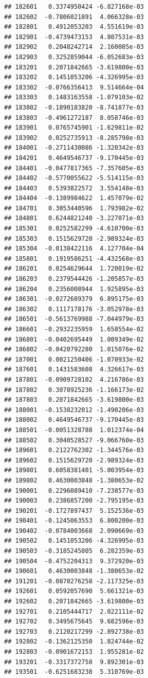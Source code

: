 \begin{frame}[fragile]
\begin{verbatim}
## 182601   0.3374950424 -6.827168e-03
## 182602  -0.7806021891  4.066328e-03
## 182801   0.4912053203  4.551619e-03
## 182901  -0.4739473153  4.807531e-03
## 182902   0.2048242714  2.160085e-03
## 182903   0.3252859044 -6.052683e-03
## 183201   0.2071842665 -3.619800e-03
## 183202   0.1451053206 -4.326995e-03
## 183302  -0.0766356413  9.514664e-04
## 183303   0.1483163558 -1.079103e-02
## 183802  -0.1890183820 -8.741877e-03
## 183803  -0.4961272187  8.058746e-03
## 183901   0.0765745901 -1.629811e-02
## 183902   0.0252735913 -8.285798e-03
## 184001  -0.2711430086 -1.320342e-03
## 184201   0.4649546737 -9.170445e-03
## 184401  -0.0477817365 -7.357605e-03
## 184402  -0.5770055622 -5.514115e-03
## 184403   0.5393822572  3.554148e-03
## 184404  -0.1389984622  1.457079e-02
## 184701   0.3053440596  1.793982e-02
## 184801   0.6244821240 -3.227071e-03
## 185301   0.0252582299 -4.610700e-03
## 185303   0.1515629720 -2.989324e-03
## 185304  -0.0138422116  4.127704e-04
## 185801   0.1919586251 -4.432568e-03
## 186201   0.0254629644  1.720019e-02
## 186203   0.2379544426 -1.205857e-03
## 186204   0.2356008944  1.925895e-03
## 186301  -0.0272689379  6.895175e-03
## 186302   0.1117178176 -3.052978e-03
## 186501  -0.5613769988 -7.044979e-03
## 186601  -0.2932235959  1.658554e-02
## 186801  -0.0402695449  1.009349e-02
## 186802  -0.0420792280  1.015076e-02
## 187001   0.0021250406 -1.070933e-02
## 187601   0.1431583608  4.326617e-03
## 187801  -0.0909728102  4.216786e-03
## 187802   0.3078925236 -1.166173e-02
## 187803   0.2071842665 -3.619800e-03
## 188001  -0.1538232012 -1.490206e-03
## 188002   0.4649546737 -9.170445e-03
## 188501  -0.0051328788  1.012374e-04
## 188502   0.3040528527 -9.066760e-03
## 189601   0.2122762302 -1.344576e-03
## 189602   0.1515629720 -2.989324e-03
## 189801   0.6058381401 -5.003954e-03
## 189802   0.4630003848 -1.380653e-02
## 190001   0.2296089410 -7.238577e-03
## 190003   0.2386857200 -2.795195e-03
## 190201  -0.1727897437  5.152536e-03
## 190401  -0.1245063553  6.800200e-03
## 190402  -0.0784003668  2.090669e-03
## 190502   0.1451053206 -4.326995e-03
## 190503  -0.3185245805  6.282359e-03
## 190504  -0.4752204313  9.372920e-03
## 190601   0.4630003848 -1.380653e-02
## 191201  -0.0870276258 -2.117325e-03
## 192601   0.0592057690  5.661321e-03
## 192602   0.2071842665 -3.619800e-03
## 192701   0.2105444717  2.022111e-02
## 192702   0.3495675645  9.682596e-03
## 192703   0.2120217299 -2.892738e-03
## 192802  -0.1362125350  1.824744e-02
## 192803  -0.0901672153  1.955281e-02
## 193201  -0.3317372758  9.892301e-03
## 193501  -0.6251683238  5.310769e-03

\end{verbatim}
\end{frame}
